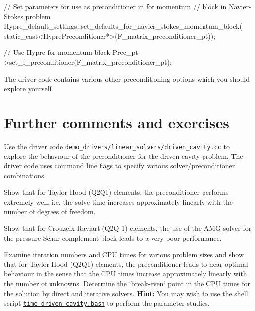 \begin{DoxyEnumerate}
\begin{DoxyCodeInclude}
       \textcolor{comment}{// Set parameters for use as preconditioner in for momentum }
       \textcolor{comment}{// block in Navier-Stokes problem}
       Hypre\_default\_settings::set\_defaults\_for\_navier\_stokes\_momentum\_block(
        static\_cast<HyprePreconditioner*>(F\_matrix\_preconditioner\_pt));
       
       \textcolor{comment}{// Use Hypre for momentum block }
       Prec\_pt->set\_f\_preconditioner(F\_matrix\_preconditioner\_pt);

\end{DoxyCodeInclude}


The driver code contains various other preconditioning options which you should explore yourself.
\end{DoxyEnumerate}

 

\hypertarget{index_comm_ex}{}\section{Further comments and exercises}\label{index_comm_ex}
Use the driver code \href{../../../../demo_drivers/linear_solvers/driven_cavity.cc}{\tt demo\+\_\+drivers/linear\+\_\+solvers/driven\+\_\+cavity.\+cc} to explore the behaviour of the preconditioner for the driven cavity problem. The driver code uses command line flags to specify various solver/preconditioner combinations.


\begin{DoxyEnumerate}
\item Show that for Taylor-\/\+Hood (Q2\+Q1) elements, the preconditioner performs extremely well, i.\+e. the solve time increases approximately linearly with the number of degrees of freedom. ~\newline
~\newline

\item Show that for Crouzeix-\/\+Raviart (Q2\+Q-\/1) elements, the use of the A\+MG solver for the pressure Schur complement block leads to a very poor performance. ~\newline
~\newline

\item Examine iteration numbers and C\+PU times for various problem sizes and show that for Taylor-\/\+Hood (Q2\+Q1) elements, the preconditioner leads to near-\/optimal behaviour in the sense that the C\+PU times increase approximately linearly with the number of unknowns. Determine the \char`\"{}break-\/even\char`\"{} point in the C\+PU times for the solution by direct and iterative solvers. {\bfseries Hint\+:} You may wish to use the shell script \href{../../../../demo_drivers/linear_solvers/time_driven_cavity.bash}{\tt time\+\_\+driven\+\_\+cavity.\+bash} to perform the parameter studies. ~\newline
~\newline

\end{DoxyEnumerate}

